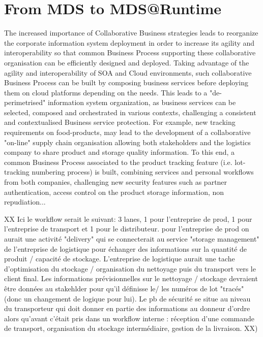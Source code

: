 \documentclass[runningheads,a4paper]{llncs}
\begin{document}
\section{From MDS to MDS@Runtime}
The increased importance of Collaborative Business strategies leads to reorganize the corporate information system deployment in order to increase its agility and interoperability so that common Business Process supporting these collaborative organisation can be efficiently designed and deployed. Taking advantage of the agility and interoperability of SOA and Cloud environments, such collaborative Business Process can be built by composing business services before deploying them on cloud platforms depending on the needs. This leads to a "de-perimetrised" information system organization, as business services can be selected,  composed and orchestrated in various contexts, challenging a consistent and contextualised Business service protection.
For example, new tracking requirements on food-products, may lead to the development of a collaborative "on-line" supply chain organisation allowing both stakeholders and the logistics company to share product and storage quality information. To this end, a common Business Process associated to the product tracking feature (i.e. lot-tracking numbering process) is built, combining services and personal workflows from both companies, challenging new security features such as partner authentication, access control on the product storage information, non repudiation...  

XX Ici le workflow serait le suivant: 3 lanes, 1 pour l'entreprise de prod, 1 pour l'entreprise de transport et 1 pour le distributeur. pour l'entreprise de prod on aurait une activit\'e "delivery" qui se connecterait au service "storage management" de l'entreprise de logistique pour \'echanger des informations sur la quantit\'e de produit / capacit\'e de stockage. L'entreprise de logistique aurait une tache d'optimisation du stockage / organisation du nettoyage puis du transport vers le client final. Les informations pr\'evisionnelles sur le nettoyage / stockage devraient \^etre donn\'ees au stakehlder pour qu'il d\'efinisse le/ les num\'eros de lot "trac\'es" (donc un changement de logique pour lui). Le pb de s\'ecurit\'e se situe au niveau du transporteur qui doit donner en partie des informations au donneur d'ordre alors qu'avant c'\'etait pris dans un workflow interne : r\'eception d'une commande de transport, organisation du stockage interm\'ediaire, gestion de la livraison. XX)
\end{document}
